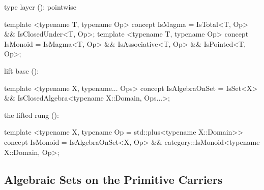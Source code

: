 \documentclass[11pt, a4paper]{article}
\begin{document}
\begin{listing}[!ht]
\caption{$\mathbf{Ddk} = \mathbf{Trsk} \cap \mathbf{Alg}$, in three panels.
\textbf{Top-left, the type layer} (): the pointwise axioms on a carrier \emph{type}: a model of a Birkhoff/Lawvere theory~\cite{burris1981universalalgebra,hylandpower2007}, a magma refined to a monoid by associativity and a unit.
\textbf{Top-right, the lift base} (): , a set \emph{object} whose carrier is closed: the subobject-over-carrier pattern familiar from proof assistants~\cite{mathlib2020}, i.e.\ $\mathbf{Trsk}$ met with carrier closure.
\textbf{Bottom, a lifted rung}:  is the lift base refined by the pointwise monoid axioms of the top-left.}
\label{lst:algebra:universal}
\noindent
\begin{minipage}[t]{0.49\linewidth}
type layer (): pointwise
\begin{cpp}
template <typename T, typename Op>
concept IsMagma  = IsTotal<T, Op>
                && IsClosedUnder<T, Op>;
template <typename T, typename Op>
concept IsMonoid = IsMagma<T, Op>
   && IsAssociative<T, Op>
   && IsPointed<T, Op>;
\end{cpp}
\end{minipage}\hfill
\begin{minipage}[t]{0.49\linewidth}
lift base (): 
\begin{cpp}
template <typename X, typename... Ops>
concept IsAlgebraOnSet = IsSet<X>
  && IsClosedAlgebra<typename X::Domain,
                     Ops...>;
\end{cpp}
\end{minipage}

\vspace{0.6ex}
\noindent
\begin{minipage}[t]{\linewidth}
the lifted rung (): 
\begin{cpp}
template <typename X, typename Op = std::plus<typename X::Domain>>
concept IsMonoid = IsAlgebraOnSet<X, Op> && category::IsMonoid<typename X::Domain, Op>;
\end{cpp}
\end{minipage}
\end{listing}

\subsection{Algebraic Sets on the Primitive Carriers}
\label{sec:algebraic_sets_primitives}
\end{document}
